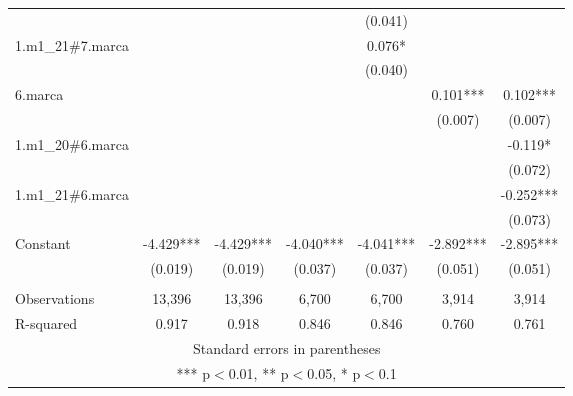\begin{tabular}{lcccccc}
 &  &  &  & (0.041) &  &  \\
1.m1\_21\#7.marca &  &  &  & 0.076* &  &  \\
 &  &  &  & (0.040) &  &  \\
6.marca &  &  &  &  & 0.101*** & 0.102*** \\
 &  &  &  &  & (0.007) & (0.007) \\
1.m1\_20\#6.marca &  &  &  &  &  & -0.119* \\
 &  &  &  &  &  & (0.072) \\
1.m1\_21\#6.marca &  &  &  &  &  & -0.252*** \\
 &  &  &  &  &  & (0.073) \\
Constant & -4.429*** & -4.429*** & -4.040*** & -4.041*** & -2.892*** & -2.895*** \\
 & (0.019) & (0.019) & (0.037) & (0.037) & (0.051) & (0.051) \\
 &  &  &  &  &  &  \\
Observations & 13,396 & 13,396 & 6,700 & 6,700 & 3,914 & 3,914 \\
 R-squared & 0.917 & 0.918 & 0.846 & 0.846 & 0.760 & 0.761 \\ \hline
\multicolumn{7}{c}{ Standard errors in parentheses} \\
\multicolumn{7}{c}{ *** p$<$0.01, ** p$<$0.05, * p$<$0.1} \\
\end{tabular}
